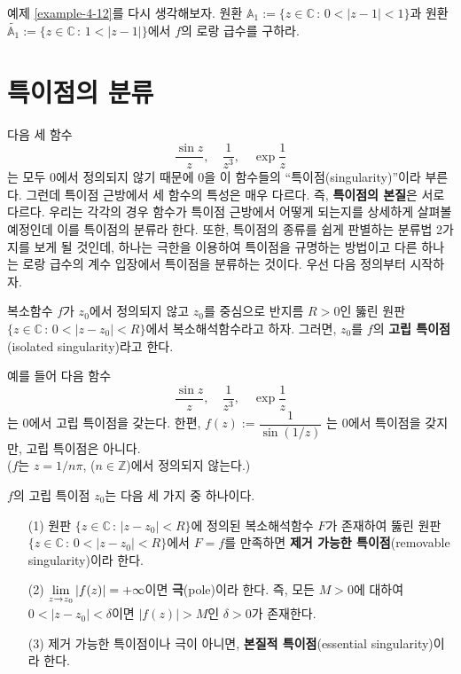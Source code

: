 \begin{salt_exercise}\label{ex-4-29}
예제 \ref{example-4-12}를 다시 생각해보자.
원환 ${\mathbb A_1}:=\{ z\in\mathbb C\,:\, 0 <|z-1|<1\}$과
원환 $\tilde{\mathbb A_1}:=\{ z\in\mathbb C\,:\, 1<|z-1|\}$에서
$f$의 로랑 급수를 구하라.
\end{salt_exercise}

\section{특이점의 분류}\label{sec-4-8}

다음 세 함수
\[
\dfrac{\sin z}{z}, \quad \dfrac1{z^3}, \quad \exp \dfrac1z
\]
는 모두 $0$에서 정의되지 않기 때문에
$0$을 이 함수들의 ``특이점(singularity)''이라 부른다.
그런데 특이점 근방에서 세 함수의 특성은 매우 다르다.
즉, {\bf 특이점의 본질}은 서로 다르다.
우리는 각각의 경우 함수가 특이점 근방에서 어떻게 되는지를 
상세하게 살펴볼 예정인데 이를 특이점의 분류라 한다.
또한, 특이점의 종류를 쉽게 판별하는 분류법 2가지를 보게 될 것인데,
하나는 극한을 이용하여 특이점을 규명하는 방법이고
다른 하나는 로랑 급수의 계수 입장에서 특이점을 분류하는 것이다.
우선 다음 정의부터 시작하자.

\begin{saltdefinition}{}{} \label{def-4-4}
복소함수 $f$가 $z_0$에서 정의되지 않고
$z_0$를 중심으로 반지름 $R>0$인
뚫린 원판 $\{z\in\mathbb C\,:\, 0<|z-z_0|<R\}$에서
복소해석함수라고 하자. 그러면, $z_0$를 $f$의 
{\bf 고립 특이점}(isolated singularity)라고 한다.
\end{saltdefinition}

\begin{saltexample}[label=example-4-13]{}{}
예를 들어 다음 함수
\[
\dfrac{\sin z}{z}, \quad \dfrac1{z^3}, \quad \exp \dfrac1z
\]
는 $0$에서 고립 특이점을 갖는다. 한편,
$
f(z):= \dfrac1{\sin (1/z)}
$
는 $0$에서 특이점을 갖지만, 고립 특이점은 아니다.\\[1ex]
($f$는 $z=1/n\pi$, ($n\in\mathbb Z$)에서 정의되지 않는다.)
\end{saltexample}

\begin{saltdefinition}{}{} \label{def-4-5}
$f$의 고립 특이점 $z_0$는 다음 세 가지 중 하나이다.
\begin{itemize}
\item[(1)] 원판 $\{z\in\mathbb C\,:\, |z-z_0|<R\}$에 정의된 복소해석함수 $F$가
존재하여
뚫린 원판 $\{z\in\mathbb C\,:\, 0<|z-z_0|<R\}$에서 $F=f$를 만족하면
{\bf 제거 가능한 특이점}(removable singularity)이라 한다.
\item[(2)] $\lim\limits_{z\to z_0} |f(z)| = + \infty$이면 {\bf 극}(pole)이라 한다.
즉, 모든 $M>0$에 대하여 $0<|z-z_0|<\delta$이면 $|f(z)|>M$인 $\delta>0$가
존재한다.
\item[(3)] 제거 가능한 특이점이나 극이 아니면,
{\bf 본질적 특이점}(essential singularity)이라 한다.
\end{itemize}
\end{saltdefinition}

